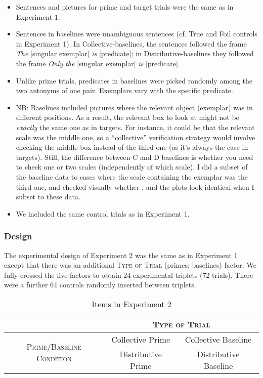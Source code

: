 \documentclass[a4paper]{article}
\newcommand{\nbMM}[1]{{\leavevmode\color{red}{\scriptsize#1}}}
\newcommand{\addMM}[1]{{\leavevmode\color{red}#1}}
\begin{document}
\begin{itemize}
\item Sentences and pictures for prime and target trials were the same as in Experiment 1. 
\item Sentences in baselines were unambiguous sentences (cf. True and Foil controls in Experiment 1). In Collective-baselines, the sentences followed the frame \textit{The} [singular exemplar] \textit{is} [predicate]; in Distributive-baselines they followed the frame \textit{Only the} [singular exemplar] \textit{is} [predicate]. 
\item Unlike prime trials, predicates in baselines were picked randomly among the two antonyms of one pair. Exemplars vary with the specific predicate. 
\
 \item \addMM{NB: Baselines included pictures where the relevant object (exemplar) was in different positions. As a result, the relevant box to look at might not be \emph{exactly} the same one as in targets. For instance, it could be that the relevant scale was the middle one, so a ``collective'' verification strategy would involve checking the middle box instead of the third one (as it's always the case in targets). Still, the difference between C and D baselines is whether you need to check one or two scales (independently of which scale). I did a subset of the baseline data to cases where the scale containing the exemplar was the third one, and checked visually whether , and the plots look identical when I subset to these data.}

\item  We included the same control trials as in Experiment 1. 
\end{itemize}


\subsubsection{Design}

The experimental design of Experiment 2 was the same as in Experiment 1 except that there was an additional \textsc{Type of Trial} (primes; baselines) factor. We fully-crossed the five factors to obtain 24 experimental triplets (72 trials). There were a further 64 controls randomly inserted between triplets. 


\begin{table}[h]
\begin{center}
\begin{tabular}{ccc}
& \multicolumn{2}{c}{\textsc{Type of Trial}}\\
\hline
\multirow{2}{*}{\textsc{Prime/Baseline Condition}} & Collective Prime &  Collective Baseline \\
& Distributive Prime &  Distributive Baseline \\
\end{tabular}
\end{center}
\caption{Items in Experiment 2}
\label{table.factors.exp2}
\end{table}%
\nbMM{Doubt: Is it confusing the naming given to baselines?}
\end{document}
